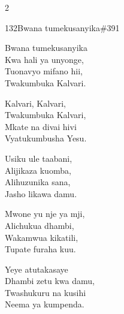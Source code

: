 \begin{multicols}{2}
\begin{hymn}{132}{Bwana tumekusanyika}{\#391}
\begin{stanza}
Bwana tumekusanyika\\
Kwa hali ya unyonge,\\
Tuonavyo mifano hii,\\
Twakumbuka Kalvari.
\end{stanza}
\begin{chorus}
Kalvari, Kalvari,\\
Twakumbuka Kalvari,\\
Mkate na divai hivi\\
Vyatukumbusha Yesu.
\end{chorus}
\begin{stanza}
Usiku ule taabani,\\
Alijikaza kuomba,\\
Alihuzunika sana,\\
Jasho likawa damu.
\end{stanza}
\begin{stanza}
Mwone yu nje ya mji,\\
Alichukua dhambi,\\
Wakamwua kikatili,\\
Tupate furaha kuu.
\end{stanza}
\begin{stanza}
Yeye atutakasaye\\
Dhambi zetu kwa damu,\\
Twashukuru na kusihi\\
Neema ya kumpenda.
\end{stanza}
\end{hymn}


\end{multicols}
